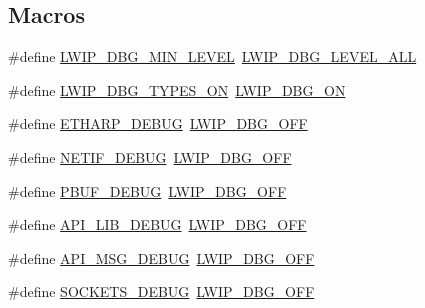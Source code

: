 \subsection*{Macros}
\begin{DoxyCompactItemize}
\item 
\#define \hyperlink{group__lwip__opts__debugmsg_ga2043f599515774f8e571ba185dbcb9e7}{L\+W\+I\+P\+\_\+\+D\+B\+G\+\_\+\+M\+I\+N\+\_\+\+L\+E\+V\+EL}~\hyperlink{group__debugging__levels_ga8ebaeb006b43f55897f3196b3617dc87}{L\+W\+I\+P\+\_\+\+D\+B\+G\+\_\+\+L\+E\+V\+E\+L\+\_\+\+A\+LL}
\item 
\#define \hyperlink{group__lwip__opts__debugmsg_gac095d0e53f5eb5b326b2cccfd071d93d}{L\+W\+I\+P\+\_\+\+D\+B\+G\+\_\+\+T\+Y\+P\+E\+S\+\_\+\+ON}~\hyperlink{group__debugging__levels_ga9e31b7cbbc8f46af8e62b548079acd4e}{L\+W\+I\+P\+\_\+\+D\+B\+G\+\_\+\+ON}
\item 
\#define \hyperlink{group__lwip__opts__debugmsg_gabff5d1e0b334f5b45bd2b8bbb675411e}{E\+T\+H\+A\+R\+P\+\_\+\+D\+E\+B\+UG}~\hyperlink{group__debugging__levels_gadab1cdc3f45939a3a5c9a3d7e04987e1}{L\+W\+I\+P\+\_\+\+D\+B\+G\+\_\+\+O\+FF}
\item 
\#define \hyperlink{group__lwip__opts__debugmsg_ga2dfad02b075a7f9a8791a66fe40864a4}{N\+E\+T\+I\+F\+\_\+\+D\+E\+B\+UG}~\hyperlink{group__debugging__levels_gadab1cdc3f45939a3a5c9a3d7e04987e1}{L\+W\+I\+P\+\_\+\+D\+B\+G\+\_\+\+O\+FF}
\item 
\#define \hyperlink{group__lwip__opts__debugmsg_ga5c3d44a0ec3bb8bd66f776c70d5c6a6c}{P\+B\+U\+F\+\_\+\+D\+E\+B\+UG}~\hyperlink{group__debugging__levels_gadab1cdc3f45939a3a5c9a3d7e04987e1}{L\+W\+I\+P\+\_\+\+D\+B\+G\+\_\+\+O\+FF}
\item 
\#define \hyperlink{group__lwip__opts__debugmsg_ga671009550216f7dc03e67ba5751e3160}{A\+P\+I\+\_\+\+L\+I\+B\+\_\+\+D\+E\+B\+UG}~\hyperlink{group__debugging__levels_gadab1cdc3f45939a3a5c9a3d7e04987e1}{L\+W\+I\+P\+\_\+\+D\+B\+G\+\_\+\+O\+FF}
\item 
\#define \hyperlink{group__lwip__opts__debugmsg_ga4279d7ff9f986b2ff3eb068bb012b697}{A\+P\+I\+\_\+\+M\+S\+G\+\_\+\+D\+E\+B\+UG}~\hyperlink{group__debugging__levels_gadab1cdc3f45939a3a5c9a3d7e04987e1}{L\+W\+I\+P\+\_\+\+D\+B\+G\+\_\+\+O\+FF}
\item 
\#define \hyperlink{group__lwip__opts__debugmsg_ga509594f3ba7d8b1356628b50b55a0934}{S\+O\+C\+K\+E\+T\+S\+\_\+\+D\+E\+B\+UG}~\hyperlink{group__debugging__levels_gadab1cdc3f45939a3a5c9a3d7e04987e1}{L\+W\+I\+P\+\_\+\+D\+B\+G\+\_\+\+O\+FF}
\item 

\end{DoxyCompactItemize}
